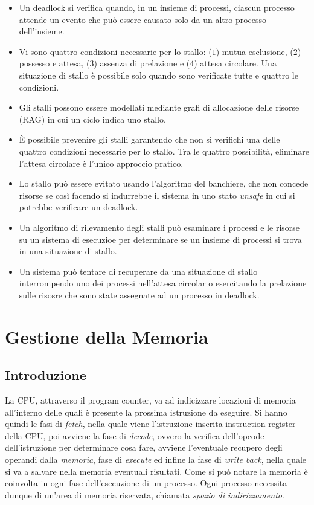 \documentclass[a4paper,12pt, twoside]{report}
\begin{document}
\begin{itemize}
\item Un deadlock si verifica quando, in un insieme di processi, ciascun processo attende un evento che pu\`o essere causato solo da un altro processo dell'insieme.
\item Vi sono quattro condizioni necessarie per lo stallo: ($1$) mutua esclusione, ($2$) possesso e attesa, ($3$) assenza di prelazione e ($4$) attesa circolare. Una situazione di stallo \`e possibile solo quando sono verificate tutte e quattro le condizioni.
\item Gli stalli possono essere modellati mediante grafi di allocazione delle risorse (RAG) in cui un ciclo indica uno stallo.
\item \`E possibile prevenire gli stalli garantendo che non si verifichi una delle quattro condizioni necessarie per lo stallo. Tra le quattro possibilit\`a, eliminare l'attesa circolare \`e l'unico approccio pratico.
\item Lo stallo pu\`o essere evitato usando l'algoritmo del banchiere, che non concede risorse se cos\`i facendo si indurrebbe il sistema in uno stato \emph{unsafe} in cui si potrebbe verificare un deadlock.
\item Un algoritmo di rilevamento degli stalli pu\`o esaminare i processi e le risorse su un sistema di esecuzioe per determinare se un insieme di processi si trova in una situazione di stallo.
\item Un sistema pu\`o tentare di recuperare da una situazione di stallo interrompendo uno dei processi nell'attesa circolar o esercitando la prelazione sulle risosre che sono state assegnate ad un processo in deadlock.
\end{itemize}


\chapter{Gestione della Memoria}

\section{Introduzione}

La CPU, attraverso il program counter, va ad indicizzare locazioni di memoria all'interno delle quali \`e presente la prossima istruzione da eseguire. Si hanno quindi le fasi di \emph{fetch}, nella quale viene l'istruzione inserita instruction register della CPU, poi avviene la fase di  \emph{decode}, ovvero la verifica dell'opcode dell'istruzione per determinare cosa fare, avviene l'eventuale recupero degli operandi dalla \emph{memoria}, fase di \emph{execute} ed infine la fase di \emph{write back}, nella quale si va a salvare nella memoria eventuali risultati.
Come si pu\`o notare la memoria \`e coinvolta in ogni fase dell'esecuzione di un processo.
Ogni processo necessita dunque di un'area di memoria riservata, chiamata \emph{spazio di indirizzamento}. 
\end{document}
